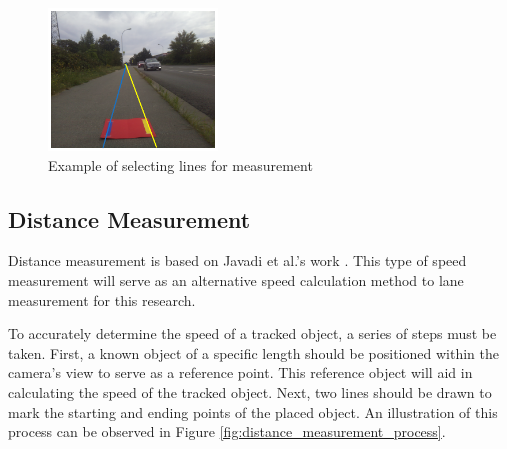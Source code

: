 \begin{figure}[!ht]
    \centering
    \includegraphics[width=0.4\textwidth]{texs/Part2/chapter4/image/mat2.png}
    \caption{Example of selecting lines for measurement}
    \label{fig:select_lines}
\end{figure}

\subsection{Distance Measurement}
\label{subsec:distance_measurement}

Distance measurement is based on Javadi et al.'s work \cite{Javadi2019}. This type of speed measurement will serve as an alternative speed calculation method to lane measurement for this research.

To accurately determine the speed of a tracked object, a series of steps must be taken. First, a known object of a specific length should be positioned within the camera's view to serve as a reference point. This reference object will aid in calculating the speed of the tracked object. Next, two lines should be drawn to mark the starting and ending points of the placed object. An illustration of this process can be observed in Figure \ref{fig:distance_measurement_process}.

